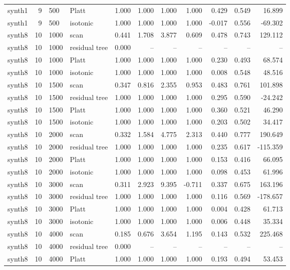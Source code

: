 \begin{tabular}{lrllrrrrrrr}
synth1 & 9 & 500 & Platt & 1.000 & 1.000 & 1.000 & 1.000 & 0.429 & 0.549 & 16.899 \\
synth1 & 9 & 500 & isotonic & 1.000 & 1.000 & 1.000 & 1.000 & -0.017 & 0.556 & -69.302 \\
synth8 & 10 & 1000 & scan & 0.441 & 1.708 & 3.877 & 0.609 & 0.478 & 0.743 & 129.112 \\
synth8 & 10 & 1000 & residual tree & 0.000 & -- & -- & -- & -- & -- & -- \\
synth8 & 10 & 1000 & Platt & 1.000 & 1.000 & 1.000 & 1.000 & 0.230 & 0.493 & 68.574 \\
synth8 & 10 & 1000 & isotonic & 1.000 & 1.000 & 1.000 & 1.000 & 0.008 & 0.548 & 48.516 \\
synth8 & 10 & 1500 & scan & 0.347 & 0.816 & 2.355 & 0.953 & 0.483 & 0.761 & 101.898 \\
synth8 & 10 & 1500 & residual tree & 1.000 & 1.000 & 1.000 & 1.000 & 0.295 & 0.590 & -24.242 \\
synth8 & 10 & 1500 & Platt & 1.000 & 1.000 & 1.000 & 1.000 & 0.360 & 0.521 & 46.290 \\
synth8 & 10 & 1500 & isotonic & 1.000 & 1.000 & 1.000 & 1.000 & 0.203 & 0.502 & 34.417 \\
synth8 & 10 & 2000 & scan & 0.332 & 1.584 & 4.775 & 2.313 & 0.440 & 0.777 & 190.649 \\
synth8 & 10 & 2000 & residual tree & 1.000 & 1.000 & 1.000 & 1.000 & 0.235 & 0.617 & -115.359 \\
synth8 & 10 & 2000 & Platt & 1.000 & 1.000 & 1.000 & 1.000 & 0.153 & 0.416 & 66.095 \\
synth8 & 10 & 2000 & isotonic & 1.000 & 1.000 & 1.000 & 1.000 & 0.098 & 0.453 & 61.996 \\
synth8 & 10 & 3000 & scan & 0.311 & 2.923 & 9.395 & -0.711 & 0.337 & 0.675 & 163.196 \\
synth8 & 10 & 3000 & residual tree & 1.000 & 1.000 & 1.000 & 1.000 & 0.116 & 0.569 & -178.657 \\
synth8 & 10 & 3000 & Platt & 1.000 & 1.000 & 1.000 & 1.000 & 0.004 & 0.428 & 61.713 \\
synth8 & 10 & 3000 & isotonic & 1.000 & 1.000 & 1.000 & 1.000 & 0.006 & 0.448 & 35.334 \\
synth8 & 10 & 4000 & scan & 0.185 & 0.676 & 3.654 & 1.195 & 0.143 & 0.532 & 225.468 \\
synth8 & 10 & 4000 & residual tree & 0.000 & -- & -- & -- & -- & -- & -- \\
synth8 & 10 & 4000 & Platt & 1.000 & 1.000 & 1.000 & 1.000 & 0.193 & 0.494 & 53.453 \\

\end{tabular}
